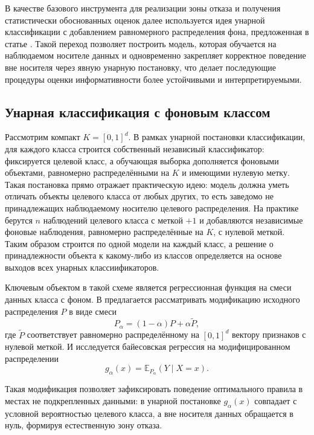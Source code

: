 \documentclass[12pt,a4paper]{article}
\begin{document}
В качестве базового инструмента для реализации зоны отказа и получения статистически
обоснованных оценок далее используется идея унарной классификации с добавлением равномерного
распределения фона, предложенная в статье \cite{unar}. Такой переход позволяет построить модель,
которая обучается на наблюдаемом носителе данных и одновременно закрепляет корректное поведение
вне носителя через явную унарную постановку, что делает последующие процедуры оценки
информативности более устойчивыми и интерпретируемыми.

\subsection{Унарная классификация с фоновым классом}

Рассмотрим компакт $K=[0,1]^d$. В рамках унарной постановки классификации, для каждого класса 
строится собственный независиый классификатор: фиксируется целевой класс,
а обучающая выборка дополняется фоновыми объектами, равномерно распределёнными на $K$ и
имеющими нулевую метку. Такая постановка прямо отражает практическую идею:
модель должна уметь отличать объекты  целевого класса от любых других,
то есть заведомо не принадлежащих наблюдаемому носителю целевого распределения. На практике 
берутся $n$ наблюдений целевого класса с меткой $+1$ и добавляются независимые фоновые 
наблюдения, равномерно распределённые на $K$, с нулевой меткой. Таким образом строится по одной 
модели на каждый класс, а решение о принадлежности объекта к какому-либо из классов определяется 
на основе выходов всех унарных классиификаторов.

Ключевым объектом в такой схеме является регрессионная функция на смеси данных класса с фоном.
В \cite{unar} предлагается рассматривать модификацию исходного распределения $P$ в виде смеси
\begin{equation}
P_\alpha=(1-\alpha)P+\alpha \widetilde P,
\end{equation}
где $\widetilde P$ соответствует равномерно распределённому на $[0,1]^d$ вектору признаков с нулевой меткой.
И исследуется байесовская регрессия на модифицированном распределении
\begin{equation}
g_\alpha(x)=\mathbb{E}_{P_\alpha}(Y\mid X=x).
\end{equation}

Такая модификация позволяет зафиксировать поведение оптимального правила в местах 
не подкрепленных данными: в унарной постановке $g_\alpha(x)$ совпадает с условной вероятностью
целевого класса, а вне носителя данных обращается в нуль, формируя
естественную зону отказа.
\end{document}
